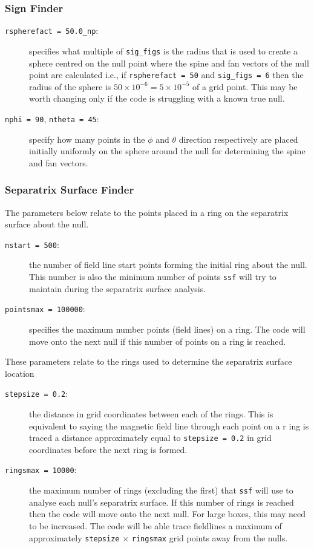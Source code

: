 \documentclass[12pt]{article}
\begin{document}
      \subsubsection{Sign Finder}
        \begin{description}
          \item [\texttt{rspherefact = 50.0\_np}:] specifies what multiple of \texttt{sig\_figs} is the radius that is used to create a sphere centred on the null point where the spine and fan vectors of the null point are calculated i.e., if \texttt{rspherefact = 50} and \texttt{sig\_figs = 6} then the radius of the sphere is  \( 50 \times 10^{-6} = 5\times 10^{-5} \) of a grid point. This may be worth changing only if the code is struggling with a known true null.
          \item [\texttt{nphi = 90}, \texttt{ntheta = 45}:] specify how many points in the \( \phi \) and \( \theta \) direction respectively are placed initially uniformly on the sphere around the null for determining the spine and fan vectors.
        \end{description}

      \subsubsection{Separatrix Surface Finder}
        The parameters below relate to the points placed in a ring on the separatrix surface about the null.
        \begin{description}
          \item [\texttt{nstart = 500}:] the number of field line start points forming the initial ring about the null. This number is also the minimum number of points \texttt{ssf} will try to maintain during the separatrix surface analysis.
          \item [\texttt{pointsmax = 100000}:] specifies the maximum number points (field lines) on a ring. The code will move onto the next null if this number of points on a ring is reached.
        \end{description}
        
        These parameters relate to the rings used to determine the separatrix surface location
        
        \begin{description}
          \item [\texttt{stepsize = 0.2}:] the distance in grid coordinates between each of the rings. This is equivalent to saying the magnetic field line through each point on a r     ing is traced a distance approximately equal to \texttt{stepsize = 0.2} in grid coordinates before the next ring is formed.
          \item [\texttt{ringsmax = 10000}:] the maximum number of rings (excluding the first) that \texttt{ssf} will use to analyse each null's separatrix surface. If this number of rings is reached then the code will move onto the next null. For large boxes, this may need to be increased. The code will be able trace fieldlines a maximum of approximately \texttt{stepsize} \( \times \) \texttt{ringsmax} grid points away from the nulls.
        \end{description}
        
\end{document}
